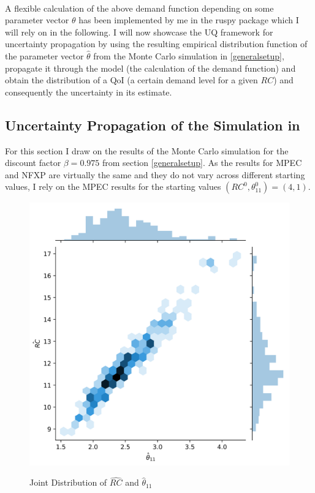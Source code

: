 \paragraph{}

A flexible calculation of the above demand function depending on some parameter vector $\theta$ has been implemented by me in the ruspy package which I will rely on in the following. I will now showcase the UQ framework for uncertainty propagation by using the resulting empirical distribution function of the parameter vector $\hat\theta$ from the Monte Carlo simulation in \ref{generalsetup}, propagate it through the model (the calculation of the demand function) and obtain the distribution of a QoI (a certain demand level for a given $RC$) and consequently the uncertainty in its estimate.

\subsection{Uncertainty Propagation of the Simulation in \cite{Iskhakov.2016}}

For this section I draw on the results of the Monte Carlo simulation for the discount factor $\beta=0.975$ from section \ref{generalsetup}. As the results for MPEC and NFXP are virtually the same and they do not vary across different starting values, I rely on the MPEC results for the starting values $(RC^0, \theta^0_{11}) = (4,1)$.

\begin{figure}[!t]
	\caption{Joint Distribution of $\hat{RC}$ and $\hat\theta_{11}$}
	\centering
	\includegraphics[scale=0.8]{../figures/figure_2.png}
	\label{figure2}
\end{figure}


